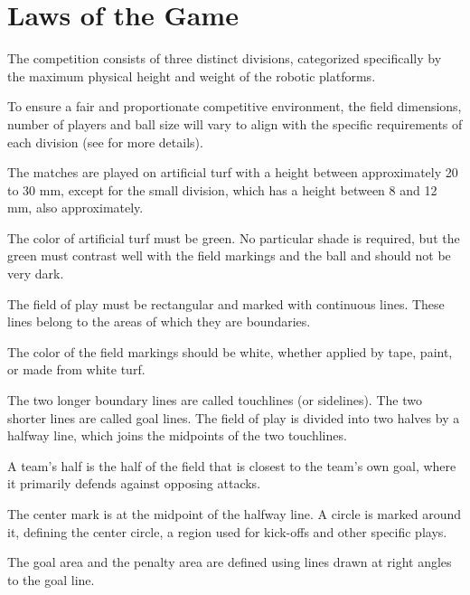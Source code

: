 \section{Laws of the Game}

\label{sec:field}


The competition consists of three distinct divisions, categorized specifically by the maximum physical height and weight of the robotic platforms.

To ensure a fair and proportionate competitive environment, the field dimensions, number of players and ball size will vary to align with the specific requirements of each division (see  for more details).

\label{sec:field_surface}

The matches are played on artificial turf with a height between approximately 20 to 30 mm, except for the small division, which has a height between 8 and 12 mm, also approximately.

The color of artificial turf must be green. No particular shade is required, but the green must contrast well with the field markings and the ball and should not be very dark.

\label{sec:field_markings}

The field of play must be rectangular and marked with continuous lines.
These lines belong to the areas of which they are boundaries.

The color of the field markings should be white, whether applied by tape, paint, or made from white turf.

The two longer boundary lines are called touchlines (or sidelines). The two shorter lines are called goal lines.
The field of play is divided into two halves by a halfway line, which joins the midpoints of the two touchlines.

A team's half is the half of the field that is closest to the team's own goal, where it primarily defends against opposing attacks.

The center mark is at the midpoint of the halfway line. A circle is marked around it, defining the center circle, a region used for kick-offs and other specific plays.

The goal area and the penalty area are defined using lines drawn at right angles to the goal line.

